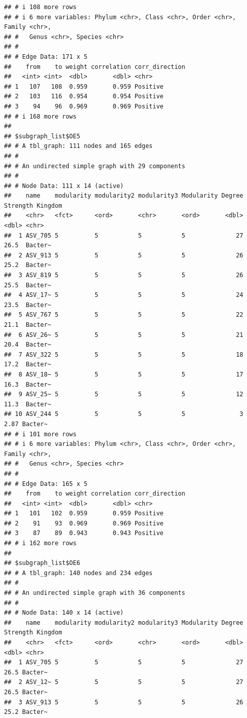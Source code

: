 \documentclass[
]{book}
\begin{document}
\begin{verbatim}
## # i 108 more rows
## # i 6 more variables: Phylum <chr>, Class <chr>, Order <chr>, Family <chr>,
## #   Genus <chr>, Species <chr>
## #
## # Edge Data: 171 x 5
##    from    to weight correlation corr_direction
##   <int> <int>  <dbl>       <dbl> <chr>         
## 1   107   108  0.959       0.959 Positive      
## 2   103   116  0.954       0.954 Positive      
## 3    94    96  0.969       0.969 Positive      
## # i 168 more rows
## 
## $subgraph_list$OE5
## # A tbl_graph: 111 nodes and 165 edges
## #
## # An undirected simple graph with 29 components
## #
## # Node Data: 111 x 14 (active)
##    name    modularity modularity2 modularity3 Modularity Degree Strength Kingdom
##    <chr>   <fct>      <ord>       <chr>       <ord>       <dbl>    <dbl> <chr>  
##  1 ASV_705 5          5           5           5              27    26.5  Bacter~
##  2 ASV_913 5          5           5           5              26    25.2  Bacter~
##  3 ASV_819 5          5           5           5              26    25.5  Bacter~
##  4 ASV_17~ 5          5           5           5              24    23.5  Bacter~
##  5 ASV_767 5          5           5           5              22    21.1  Bacter~
##  6 ASV_26~ 5          5           5           5              21    20.4  Bacter~
##  7 ASV_322 5          5           5           5              18    17.2  Bacter~
##  8 ASV_18~ 5          5           5           5              17    16.3  Bacter~
##  9 ASV_25~ 5          5           5           5              12    11.3  Bacter~
## 10 ASV_244 5          5           5           5               3     2.87 Bacter~
## # i 101 more rows
## # i 6 more variables: Phylum <chr>, Class <chr>, Order <chr>, Family <chr>,
## #   Genus <chr>, Species <chr>
## #
## # Edge Data: 165 x 5
##    from    to weight correlation corr_direction
##   <int> <int>  <dbl>       <dbl> <chr>         
## 1   101   102  0.959       0.959 Positive      
## 2    91    93  0.969       0.969 Positive      
## 3    87    89  0.943       0.943 Positive      
## # i 162 more rows
## 
## $subgraph_list$OE6
## # A tbl_graph: 140 nodes and 234 edges
## #
## # An undirected simple graph with 36 components
## #
## # Node Data: 140 x 14 (active)
##    name    modularity modularity2 modularity3 Modularity Degree Strength Kingdom
##    <chr>   <fct>      <ord>       <chr>       <ord>       <dbl>    <dbl> <chr>  
##  1 ASV_705 5          5           5           5              27     26.5 Bacter~
##  2 ASV_12~ 5          5           5           5              27     26.5 Bacter~
##  3 ASV_913 5          5           5           5              26     25.2 Bacter~

\end{verbatim}
\end{document}
